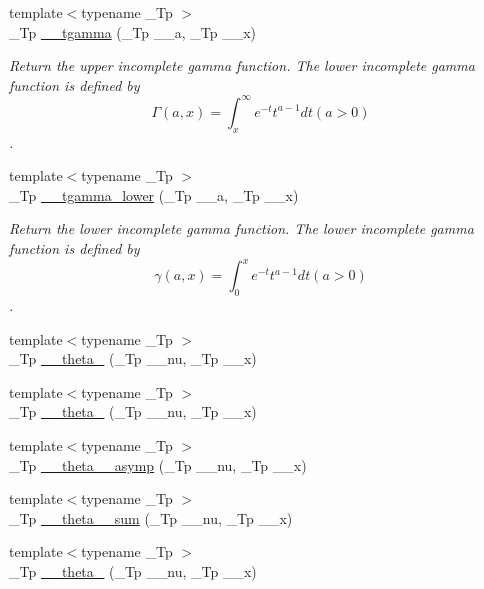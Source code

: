 \begin{DoxyCompactItemize}
\item 
{\footnotesize template$<$typename \+\_\+\+Tp $>$ }\\\+\_\+\+Tp \hyperlink{namespacestd_1_1____detail_ad2f6546e22348b07d992d522153d7d6b}{\+\_\+\+\_\+tgamma} (\+\_\+\+Tp \+\_\+\+\_\+a, \+\_\+\+Tp \+\_\+\+\_\+x)
\begin{DoxyCompactList}\small\item\em Return the upper incomplete gamma function. The lower incomplete gamma function is defined by \[ \Gamma(a,x) = \int_x^\infty e^{-t}t^{a-1}dt (a > 0) \]. \end{DoxyCompactList}\item 
{\footnotesize template$<$typename \+\_\+\+Tp $>$ }\\\+\_\+\+Tp \hyperlink{namespacestd_1_1____detail_ad85ad5ffdb1bab9b1e3b6fd7a114fb0d}{\+\_\+\+\_\+tgamma\+\_\+lower} (\+\_\+\+Tp \+\_\+\+\_\+a, \+\_\+\+Tp \+\_\+\+\_\+x)
\begin{DoxyCompactList}\small\item\em Return the lower incomplete gamma function. The lower incomplete gamma function is defined by \[ \gamma(a,x) = \int_0^x e^{-t}t^{a-1}dt (a > 0) \]. \end{DoxyCompactList}\item 
{\footnotesize template$<$typename \+\_\+\+Tp $>$ }\\\+\_\+\+Tp \hyperlink{namespacestd_1_1____detail_af7f54a82d2e5f0d8758cf53ebb2500e8}{\+\_\+\+\_\+theta\+\_} (\+\_\+\+Tp \+\_\+\+\_\+nu, \+\_\+\+Tp \+\_\+\+\_\+x)
\item 
{\footnotesize template$<$typename \+\_\+\+Tp $>$ }\\\+\_\+\+Tp \hyperlink{namespacestd_1_1____detail_ae783991fe49b94dff4ac9e3ebb446d4f}{\+\_\+\+\_\+theta\+\_} (\+\_\+\+Tp \+\_\+\+\_\+nu, \+\_\+\+Tp \+\_\+\+\_\+x)
\item 
{\footnotesize template$<$typename \+\_\+\+Tp $>$ }\\\+\_\+\+Tp \hyperlink{namespacestd_1_1____detail_ac7207ce23916e29df96b3b2159b55150}{\+\_\+\+\_\+theta\+\_\+\_\+asymp} (\+\_\+\+Tp \+\_\+\+\_\+nu, \+\_\+\+Tp \+\_\+\+\_\+x)
\item 
{\footnotesize template$<$typename \+\_\+\+Tp $>$ }\\\+\_\+\+Tp \hyperlink{namespacestd_1_1____detail_af434f6a07d92577f40f352aa3d44483c}{\+\_\+\+\_\+theta\+\_\+\_\+sum} (\+\_\+\+Tp \+\_\+\+\_\+nu, \+\_\+\+Tp \+\_\+\+\_\+x)
\item 
{\footnotesize template$<$typename \+\_\+\+Tp $>$ }\\\+\_\+\+Tp \hyperlink{namespacestd_1_1____detail_a6f965c639307555e5979b954a11ca0b8}{\+\_\+\+\_\+theta\+\_} (\+\_\+\+Tp \+\_\+\+\_\+nu, \+\_\+\+Tp \+\_\+\+\_\+x)

\end{DoxyCompactItemize}
